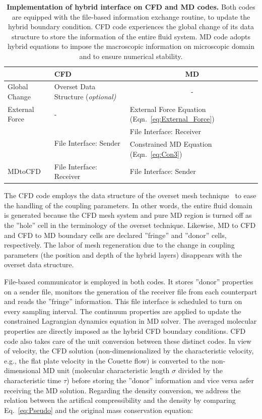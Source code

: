 \documentclass[preprint,12pt]{elsarticle}
\begin{document}
\begin{table}
  \caption{\small
{\bf Implementation of hybrid interface on CFD and MD codes.} Both codes are equipped with the file-based information exchange routine, to update the hybrid boundary condition. CFD code experiences the global change of its data structure to store the information of the entire fluid system. MD code adopts 
hybrid equations to impose the macroscopic information on microscopic domain and to ensure numerical stability. 
}
  \label{table:interface_implementation}
  \centering
\footnotesize
 \begin{tabular}{>{\centering}p{} || p{} | p{} }
\hline
  & \centering CFD & \multicolumn{1}{c}{MD} \\
\hline
 Global Change & Overset Data Structure (\it{optional}) & \multicolumn{1}{c}{-} \\
\hline
 \centering External Force & \centering - & External Force Equation (Eqn.~\ref{eq:External_Force}) \\
\hline
 \multirow{2}{*}{CFDtoMD} &  \multirow{2}{*}{File Interface: Sender} & {File Interface: Receiver} \\
 & & Constrained MD Equation (Eqn.~\ref{eq:Con3}) \\
\hline
 MDtoCFD & File Interface: Receiver & File Interface: Sender \\
\hline
\end{tabular}
\vspace{-1em}
\end{table}


The CFD code employs the data structure of the overset mesh technique~\cite{Chimera}  to ease the handling of the coupling parameters. In other words, the entire fluid domain is generated because the CFD mesh system and pure MD region is turned off as the ''hole'' cell in the terminology of the overset technique. Likewise, MD to CFD and CFD to MD boundary cells are declared ''fringe'' and ''donor'' cells, respectively. The labor of mesh regeneration due to the change in coupling parameters (the position and depth of the hybrid layers) disappears with the overset data structure.

File-based communicator is employed in both codes. It stores ''donor'' properties on a sender file, monitors the generation of the receiver file from each counterpart and reads the ''fringe'' information. This file interface is scheduled to turn on every sampling interval. The continuum properties are applied to update the constrained Lagrangian dynamics equation in MD solver. The averaged molecular properties are directly imposed as the hybrid CFD boundary conditions. CFD code also takes care of the unit conversion between these distinct codes.
In view of velocity, the CFD solution (non-dimensionalized by the characteristic velocity, e.g., the flat plate velocity in the Couette flow) is converted to the non-dimensional MD unit (molecular characteristic length $\sigma$ divided by the characteristic time $\tau$) before storing the ''donor'' information and vice versa asfer receiving the MD solution.
Regarding the density conversion, we address the relation between the artifical compressibility and the density by comparing Eq.~\ref{eq:Pseudo} and the original mass conservation equation: 
\end{document}
